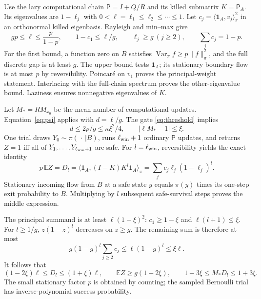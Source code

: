 \documentclass[10pt,a4paper]{article}
\theoremstyle{definition}\newtheorem{assumption}[theorem]{Assumption}
\newcommand{\E}{\mathbb E}
\newcommand{\Var}{\operatorname{Var}}
\newcommand{\one}{\mathbf 1}
\newcommand{\ip}[2]{\langle #1,#2\rangle_\pi}
\begin{document}
Use the lazy computational chain $\mathsf P=I+Q/R$ and its killed submatrix $K=\mathsf P_A$. Its eigenvalues are $1-\ell_j$ with $0<\ell=\ell_1\le\ell_2\le\cdots\le1$. Let
$c_j=\ip{\one_A}{v_j}^2$ in an orthonormal killed eigenbasis. Rayleigh and min--max give
\begin{equation}
 gp\le\ell\le\frac{p}{1-p},\qquad
 1-c_1\le\ell/g,\qquad
 \ell_j\ge g\ (j\ge2),\qquad \sum_jc_j=1-p.
 \label{eq:spectralsandwich}
\end{equation}
For the first bound, a function zero on $B$ satisfies
$\Var_\pi f\ge p\|f\|_\pi^2$, and the full discrete gap is at least $g$.
The upper bound tests $\one_A$; its stationary boundary flow is at most $p$ by reversibility. Poincar\'e on $v_1$ proves the principal-weight statement. Interlacing with the full-chain spectrum proves the other-eigenvalue bound. Laziness ensures nonnegative eigenvalues of $K$.

Let $M_*=RM_{x_0}$ be the mean number of computational updates. Equation~\eqref{eq:psi} applies with $d=\ell/g$. The gate \eqref{eq:threshold} implies
\[
 d\le 2p/g\le\kappa\xi^2/4,\qquad
 |\ell M_*-1|\le\xi.
\]
One trial draws $Y_0\sim\pi(\,\cdot\,|B)$, runs $\ell_{\rm win}+1$ ordinary $\mathsf P$ updates, and returns $Z=1$ iff all of $Y_1,\ldots,Y_{\ell_{\rm win}+1}$ are safe. For $l=\ell_{\rm win}$, reversibility yields the exact identity
\begin{equation}
 p\,\E Z=D_l
 =\ip{\one_A}{(I-K)K^l\one_A}
 =\sum_j c_j\ell_j(1-\ell_j)^l.
 \label{eq:shortflux}
\end{equation}
Stationary incoming flow from $B$ at a safe state $y$ equals $\pi(y)$ times its one-step exit probability to $B$. Multiplying by $l$ subsequent safe-survival steps proves the middle expression.

The principal summand is at least $\ell(1-\xi)^2$: $c_1\ge1-\xi$ and $\ell(l+1)\le\xi$. For $l\ge1/g$, $z(1-z)^l$ decreases on $z\ge g$. The remaining sum is therefore at most
\[
 g(1-g)^l\sum_{j\ge2}c_j
 \le \ell(1-g)^l\le\xi\ell.
\]
It follows that
\begin{equation}
 (1-2\xi)\ell\le D_l\le(1+\xi)\ell,\qquad
 \E Z\ge g(1-2\xi),\qquad
 1-3\xi\le M_*D_l\le1+3\xi .
 \label{eq:shortbounds}
\end{equation}
The small stationary factor $p$ is obtained by counting; the sampled Bernoulli trial has inverse-polynomial success probability.
\end{document}
